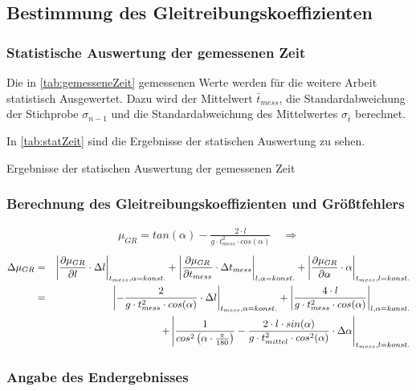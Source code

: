 \subsection{Bestimmung des Gleitreibungskoeffizienten}

\subsubsection{Statistische Auswertung der gemessenen Zeit}

Die in \autoref{tab:gemesseneZeit} gemessenen Werte werden für die weitere Arbeit statistisch Ausgewertet. Dazu wird der Mittelwert $\bar{t}_{mess}$, die Standardabweichung der Stichprobe $\sigma_{n-1}$ und die Standardabweichung des Mittelwertes $\sigma_{\bar{t}}$ berechnet.

In \autoref{tab:statZeit} sind die Ergebnisse der statischen Auswertung zu sehen.

\begin{table}[h]
    \center 
    \caption[Statistische Auswertung der gemessenen Zeit]{Ergebnisse der statischen Auswertung der gemessenen Zeit}
    
    \label{tab:statZeit}
\end{table}

\subsubsection{Berechnung des Gleitreibungskoeffizienten und Größtfehlers}

\begin{align}
    \mu_{GR} = tan(\alpha) - \frac{2 \cdot l}{g \cdot t_{mess}^2 \cdot cos(\alpha)} \quad \Rightarrow
  \end{align}
  \begin{equation}
    \begin{alignedat}{2}
      \Delta \mu_{GR} &= &\quad \abs*{\frac{\partial \mu_{GR}}{\partial l} \cdot \Delta l}_{t_{mess},\alpha = konst.} + \abs*{\frac{\partial \mu_{GR}}{\partial t_{mess}} \cdot \Delta t_{mess}}_{l,\alpha = konst.} + \abs*{\frac{\partial \mu_{GR}}{\partial \alpha} \cdot \alpha}_{t_{mess},l = konst.}\\
      &= &\, \abs*{-\frac{2}{g \cdot t_{mess}^2 \cdot cos(\alpha)}\cdot \Delta l}_{t_{mess},\alpha = konst.} + \abs*{\frac{4 \cdot l}{g \cdot t_{mess}^2 \cdot cos(\alpha)}}_{l,\alpha = konst.} \\ 
      &\quad  &+ \, \abs*{\frac{1}{cos^2\left( \alpha \cdot  \frac{\pi}{180} \right)} -\frac{2 \cdot l \cdot sin(\alpha)}{g \cdot t_{mittel}^2 \cdot cos^2(\alpha)} \cdot \Delta \alpha}_{t_{mess},l = konst.}
    \end{alignedat}
  \end{equation}

\subsubsection{Angabe des Endergebnisses}